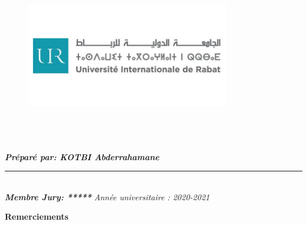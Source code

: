 \documentclass[a4paper]{report}
\begin{document}
\begin{titlepage}
\begin{center}
        \vspace*{0.5cm} \noindent \hspace{ -0.5 cm} \large
        \begin{figure}[H]
            \begin{center}
                \includegraphics[width=3.5in,height=3in]{images/logo-uir2.jpg}
            \end{center}
        \end{figure}
        \raggedright
        {\textbf{\emph{Préparé par: KOTBI Abderrahamane}}}
        \raggedleft

        \rule{0.7\linewidth}{2pt}\\
        \raggedleft
        {\textbf{\emph{Membre Jury: *****}}}
        \Large \emph{Année universitaire : 2020-2021}

    \end{center}
\end{titlepage}
 \setcounter{page}{1}
\begin{doublespace}
    \begin{center}
        \vspace*{1cm}

        \textbf{\huge{Remerciements}}

    \end{center}
\end{doublespace}
\end{document}

